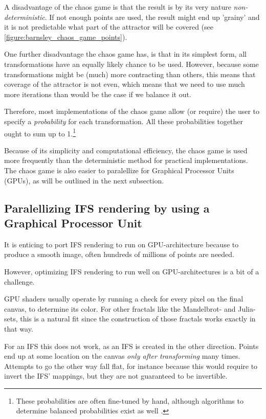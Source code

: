 \documentclass[11pt]{article}
\newcommand*{\altasterism}{\vspace*{1em plus .5em minus .5em}\noindent\hspace*{\fill}\ding{104}\hspace*{\fill}}
\begin{document}
A disadvantage of the chaos game is that the result is by its very nature \emph{non-deterministic}.
If not enough points are used, the result might end up 'grainy' and it is not predictable what part of the attractor will be covered (see \autoref{figure:barnsley_chaos_game_points}).


One further disadvantage the chaos game has, is that in its simplest form, all transformations have an equally likely chance to be used.
However, because some transformations might be (much) more contracting than others, this means that coverage of the attractor is not even,
which means that we need to use much more iterations than would be the case if we balance it out.

Therefore, most implementations of the chaos game allow (or require) the user to specify a \emph{probability} for each transformation.
All these probabilities together ought to sum up to 1.\footnote{These probabilities are often fine-tuned by hand, although algorithms to determine balanced probabilities exist as well \cite{hepting1991rendering}.}

\altasterism

Because of its simplicity and computational efficiency, the chaos game is used more frequently than the deterministic method for practical implementations.
The chaos game is also easier to paralellize for Graphical Processor Units (GPUs), as will be outlined in the next subsection.

\subsection{Paralellizing IFS rendering by using a Graphical Processor Unit}
\label{sec:org49b5ea7}

It is enticing to port IFS rendering to run on GPU-architecture because to produce a smooth image, often hundreds of millions of points are needed.

However, optimizing IFS rendering to run well on GPU-architectures is a bit of a challenge.

GPU shaders usually operate by running a check for every pixel on the final canvas, to determine its color.
For other fractals like the Mandelbrot- and Julia-sets, this is a natural fit since the construction of those fractals works exactly in that way.

For an IFS this does not work, as an IFS is created in the other direction. Points end up at some location on the canvas \emph{only after transforming} many times.
Attempts to go the other way fall flat, for instance because this would require to invert the IFS' mappings, but they are not guaranteed to be invertible.
\end{document}
